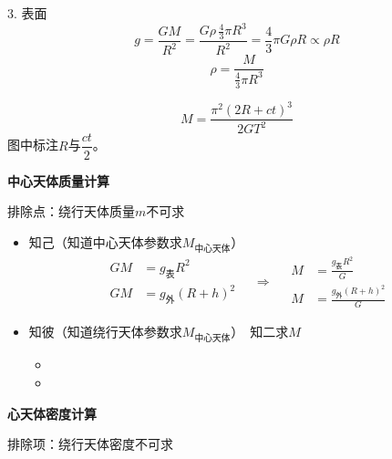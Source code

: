3. 表面
\[
g=\frac{GM}{R^{2}}=\frac{G\rho\,\frac{4}{3}\pi R^{3}}{R^{2}}=\frac{4}{3}\pi G\rho R\propto\rho R
\]
\[ \rho=\frac{M}{\frac{4}{3}\pi R^{3}} \]

\[
M=\frac{\pi^2(2R+ct)^3}{2GT^2}
\]
图中标注$R$与$\dfrac{ct}{2}$。

\textbf{中心天体质量计算}

排除点：绕行天体质量$m$不可求\quad{}%

\begin{itemize}
\item 知己（知道中心天体参数求$M_{\text{中心天体}}$）
\[
\begin{aligned}GM&=g_{\text{表}}R^{2}\\ GM&=g_{\text{外}}(R+h)^{2}\end{aligned}
\quad\Rightarrow\quad
\begin{aligned}M&=\frac{g_{\text{表}}R^{2}}{G}\\ M&=\frac{g_{\text{外}}(R+h)^{2}}{G}\end{aligned}
\]
\item 知彼（知道绕行天体参数求$M_{\text{中心天体}}$）\quad [$v$、$\omega/T$、$r$、$a$]\ 知二求$M$
  \begin{itemize}
  \item {}
  \item {}%
  \end{itemize}
\end{itemize}

\textbf{心天体密度计算}%


排除项：绕行天体密度不可求

